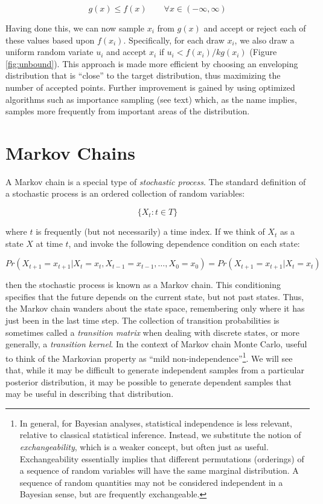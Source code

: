 \documentclass[]{book}
\begin{document}
\[
g(x) \le  f(x) \qquad\forall x \in (-\infty,\infty)
\]

Having done this, we can now sample ${x_i}$ from $g(x)$ and accept or reject each of these values based upon $f(x_i)$. Specifically, for each draw $x_i$, we also draw a uniform random variate $u_i$ and accept $x_i$ if $u_i < f(x_i)/kg(x_i)$ (Figure \ref{fig:unbound}). This approach is made more efficient by choosing an enveloping distribution that is ``close'' to the target distribution, thus maximizing the number of accepted points. Further improvement is gained by using optimized algorithms such as importance sampling (see text) which, as the name implies, samples more frequently from important areas of the distribution.

\section{Markov Chains}

A Markov chain is a special type of \emph{stochastic process}. The standard definition of a stochastic process is an ordered collection of random variables:

\[
\{X_t:t \in T\}
\]

\noindent where $t$ is frequently (but not necessarily) a time index. If we think of $X_t$ as a state $X$ at time $t$, and invoke the following dependence condition on each state:

\[
Pr(X_{t+1}=x_{t+1} | X_t=x_t, X_{t-1}=x_{t-1},\ldots,X_0=x_0) = Pr(X_{t+1}=x_{t+1} | X_t=x_t)
\]

\noindent then the stochastic process is known as a Markov chain. This conditioning specifies that the future depends on the current state, but not past states. Thus, the Markov chain wanders about the state space, remembering only where it has just been in the last time step. The collection of transition probabilities is sometimes called a \emph{transition matrix} when dealing with discrete states, or more generally, a \emph{transition kernel}. In the context of Markov chain Monte Carlo, useful to think of the Markovian property as ``mild non-independence''\footnote{In general, for Bayesian analyses, statistical independence is less relevant, relative to classical statistical inference. Instead, we substitute the notion of \emph{exchangeability}, which is a weaker concept, but often just as useful. Exchangeability essentially implies that different permutations (orderings) of a sequence of random variables will have the same marginal distribution. A sequence of random quantities may not be considered independent in a Bayesian sense, but are frequently exchangeable.}. We will see that, while it may be difficult to generate independent samples from a particular posterior distribution, it may be possible to generate dependent samples that may be useful in describing that distribution.
\end{document}

